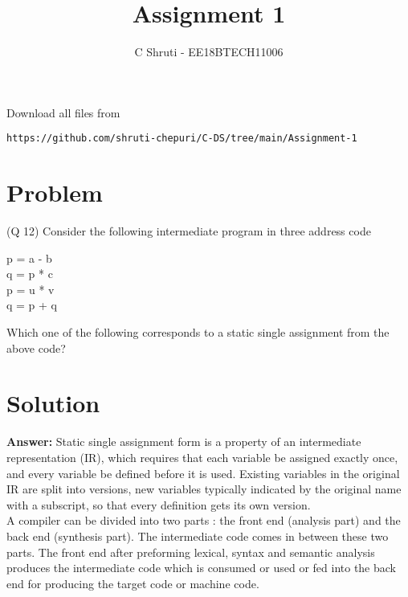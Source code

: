 \documentclass[journal,12pt,twocolumn]{IEEEtran}
\begin{document}
     \def\rightbox#1{\makebox[0in][r]{#1}}
     \def\centbox#1{\makebox[0in]{#1}}
     \def\topbox#1{\raisebox{-\baselineskip}[0in][0in]{#1}}
     \def\midbox#1{\raisebox{-0.5\baselineskip}[0in][0in]{#1}}
\vspace{3cm}
\title{Assignment 1}
\author{C Shruti - EE18BTECH11006}
\maketitle
\newpage
\bigskip
\renewcommand{\thefigure}{\theenumi}
\renewcommand{\thetable}{\theenumi}
Download all files from 
%
\begin{lstlisting}
https://github.com/shruti-chepuri/C-DS/tree/main/Assignment-1
\end{lstlisting}
\section{Problem}
(Q 12) Consider the following intermediate program in three address code
\begin{tcolorbox}
p  = a - b \\
q = p * c \\
p = u * v \\
q = p + q \\
\end{tcolorbox}
Which one of the following corresponds to a static single assignment from the above code?
\section{Solution}
\textbf{Answer:} 
\newline
Static single assignment form is a property of an intermediate representation (IR), which requires that each variable be assigned exactly once, and every variable be defined before it is used. Existing variables in the original IR are split into versions, new variables typically indicated by the original name with a subscript, so that every definition gets its own version.\\

 A compiler can be divided into two parts : the front end (analysis part) and the back end (synthesis part). The intermediate code comes in between these two parts. The front end after preforming lexical, syntax and semantic analysis produces the intermediate code which is consumed or used or fed into the back end for producing the target code or machine code. \\
 
\end{document}
